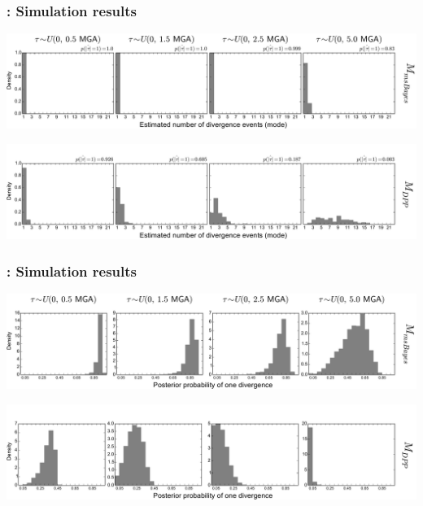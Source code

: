\begin{frame}[t]
    \frametitle{\dppmsbayes: Simulation results}
    \vspace{1cm}
        \centerline{
        \includegraphics[width=1.13\textwidth]{../images/old_old_power_psi_mode.pdf}}
        \vspace{0mm}
        \centerline{
        \includegraphics[width=1.13\textwidth]{../images/old_dpp_power_psi_mode_headless.pdf}}
\end{frame}

\begin{frame}[t]
    \frametitle{\dppmsbayes: Simulation results}
    \vspace{1cm}
        \centerline{
        \includegraphics[width=1.13\textwidth]{../images/old_old_power_psi_prob.pdf}}
        \vspace{0mm}
        \centerline{
        \includegraphics[width=1.13\textwidth]{../images/old_dpp_power_psi_prob_headless.pdf}}
\end{frame}

